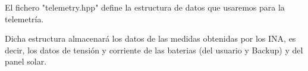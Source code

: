 
El fichero "telemetry.hpp" define la estructura de datos que usaremos para la telemetría.

Dicha estructura almacenará los datos de las medidas obtenidas por los INA, es decir, los datos de tensión y corriente de las baterias (del usuario y Backup) y del panel solar.

